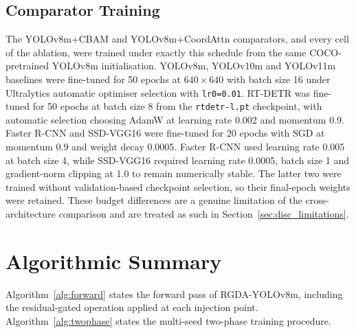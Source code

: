 \documentclass[MScCS]{uccthesis}
\begin{document}
\subsection{Comparator Training}

The YOLOv8m+CBAM and YOLOv8m+CoordAttn comparators, and every cell of the
ablation, were trained under exactly this schedule from the same
COCO-pretrained YOLOv8m initialisation. YOLOv8m, YOLOv10m and YOLOv11m
baselines were fine-tuned for 50 epochs at $640 \times 640$ with batch size 16
under Ultralytics automatic optimiser selection with \texttt{lr0=0.01}. RT-DETR
was fine-tuned for 50 epochs at batch size 8 from the \texttt{rtdetr-l.pt}
checkpoint, with automatic selection choosing AdamW at learning rate 0.002 and
momentum 0.9. Faster R-CNN and SSD-VGG16 were fine-tuned for 20 epochs with SGD
at momentum 0.9 and weight decay 0.0005. Faster R-CNN used learning rate 0.005
at batch size 4, while SSD-VGG16 required learning rate 0.0005, batch size 1
and gradient-norm clipping at 1.0 to remain numerically stable. The latter two
were trained without validation-based checkpoint selection, so their
final-epoch weights were retained. These budget differences are a genuine
limitation of the cross-architecture comparison and are treated as such in
Section~\ref{sec:disc_limitations}.

\section{Algorithmic Summary}
\label{sec:algorithms}

Algorithm~\ref{alg:forward} states the forward pass of RGDA-YOLOv8m, including
the residual-gated operation applied at each injection point.
Algorithm~\ref{alg:twophase} states the multi-seed two-phase training
procedure.
\end{document}
